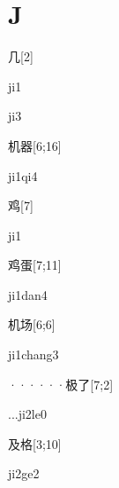 ﻿%
\section*{J}

\begin{verbete}[ji1]{几}[2]
\begin{pronuncia}{ji1}
\end{pronuncia}
\begin{pronuncia}{ji3}
\end{pronuncia}
\end{verbete}

\begin{verbete}[ji1qi4]{机器}[6;16]
\begin{pronuncia}{ji1qi4}
\end{pronuncia}
\end{verbete}

\begin{verbete}[ji1]{鸡}[7]
\begin{pronuncia}{ji1}
\end{pronuncia}
\end{verbete}

\begin{verbete}[ji1dan4]{鸡蛋}[7;11]
\begin{pronuncia}{ji1dan4}
\end{pronuncia}
\end{verbete}

\begin{verbete}[ji1chang3]{机场}[6;6]
\begin{pronuncia}{ji1chang3}
\end{pronuncia}
\end{verbete}

\begin{verbete}[...ji2le0]{······极了}[7;2]
\begin{pronuncia}{...ji2le0}
\end{pronuncia}
\end{verbete}

\begin{verbete}[ji2ge2]{及格}[3;10]
\begin{pronuncia}{ji2ge2}
\end{pronuncia}
\end{verbete}

